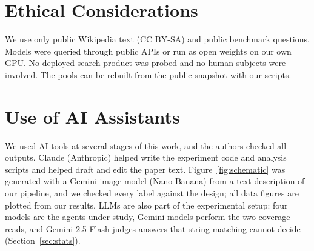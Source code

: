 \section*{Ethical Considerations}
We use only public Wikipedia text (CC BY-SA) and public benchmark questions. Models were queried through public APIs or run as open weights on our own GPU. No deployed search product was probed and no human subjects were involved. The pools can be rebuilt from the public snapshot with our scripts.

\section*{Use of AI Assistants}
We used AI tools at several stages of this work, and the authors checked all outputs. Claude (Anthropic) helped write the experiment code and analysis scripts and helped draft and edit the paper text. Figure~\ref{fig:schematic} was generated with a Gemini image model (Nano Banana) from a text description of our pipeline, and we checked every label against the design; all data figures are plotted from our results. LLMs are also part of the experimental setup: four models are the agents under study, Gemini models perform the two coverage reads, and Gemini 2.5 Flash judges answers that string matching cannot decide (Section~\ref{sec:stats}).
